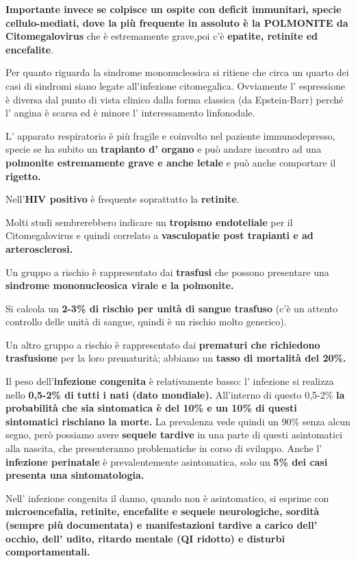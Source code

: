   \textbf{Importante invece se colpisce un ospite con deficit
  immunitari, specie cellulo-mediati, dove la più frequente in assoluto
  è la POLMONITE da Citomegalovirus} che è estremamente grave,poi c'è
  \textbf{epatite, retinite ed encefalite}.

  Per quanto riguarda la sindrome mononucleosica si ritiene che circa un
  quarto dei casi di sindromi siano legate all'infezione citomegalica.
  Ovviamente l' espressione è diversa dal punto di vista clinico dalla
  forma classica (da Epstein-Barr) perché l' angina è scarsa ed è minore
  l' interessamento linfonodale.

  L' apparato respiratorio è più fragile e coinvolto nel paziente
  immunodepresso, specie se ha subito un \textbf{trapianto d' organo} e
  può andare incontro ad una \textbf{polmonite estremamente grave e
  anche letale} e può anche comportare il \textbf{rigetto.}

  Nell'\textbf{HIV positivo} è frequente soprattutto la
  \textbf{retinite}.

  Molti studi sembrerebbero indicare un \textbf{tropismo endoteliale}
  per il Citomegalovirus e quindi correlato a \textbf{vasculopatie post
  trapianti e ad arterosclerosi.}

  Un gruppo a rischio è rappresentato dai \textbf{trasfusi} che possono
  presentare una \textbf{sindrome mononucleosica virale e la polmonite.}

  Si calcola un \textbf{2-3\% di rischio per unità di sangue trasfuso}
  (c'è un attento controllo delle unità di sangue, quindi è un rischio
  molto generico).

  Un altro gruppo a rischio è rappresentato dai \textbf{prematuri che
  richiedono trasfusione} per la loro prematurità; abbiamo un
  \textbf{tasso di mortalità del 20\%.}

  Il peso dell'\textbf{infezione congenita} è relativamente basso: l'
  infezione si realizza nello \textbf{0,5-2\% di tutti i nati (dato
  mondiale).} All'interno di questo 0,5-2\% \textbf{la probabilità che
  sia sintomatica è del 10\% e un 10\% di questi sintomatici rischiano
  la morte.} La prevalenza vede quindi un 90\% senza alcun segno, però
  possiamo avere \textbf{sequele tardive} in una parte di questi
  asintomatici alla nascita, che presenteranno problematiche in corso di
  sviluppo. Anche l' \textbf{infezione perinatale} è prevalentemente
  asintomatica, solo un \textbf{5\% dei casi presenta una
  sintomatologia.}

  Nell' infezione congenita il danno, quando non è asintomatico, si
  esprime con \textbf{microencefalia, retinite, encefalite e sequele
  neurologiche, sordità (sempre più documentata) e manifestazioni
  tardive a carico dell' occhio, dell' udito, ritardo mentale (QI
  ridotto) e disturbi comportamentali.}

